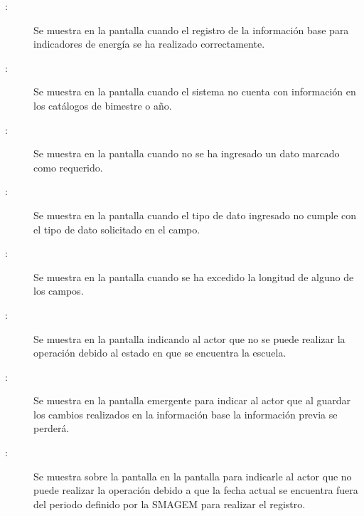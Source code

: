     \begin{description}
      
	    \item [:] Se muestra en la pantalla  cuando el registro de la información base para indicadores de energía se ha realizado correctamente.
	    
	    \item [:] Se muestra en la pantalla  cuando el sistema no cuenta con información en los catálogos de bimestre o año.
	    
	    \item [:] Se muestra en la pantalla  cuando no se ha ingresado un dato marcado como requerido.
	    
	    \item [:] Se muestra en la pantalla  cuando el tipo de dato ingresado no cumple con el tipo de dato solicitado en el campo.
	    
	    \item [:] Se muestra en la pantalla  cuando se ha excedido la longitud de alguno de los campos.	    
	      
	    \item[:] Se muestra en la pantalla  indicando al actor que no se puede realizar la operación debido al estado en que se encuentra la escuela.
	    
	    \item [:] Se muestra en la pantalla emergente  para indicar al actor que al guardar los cambios realizados en la información base la información previa se perderá.  
	    
	    \item [:] Se muestra sobre la pantalla en la pantalla  para indicarle al actor que no puede realizar la operación debido a que la fecha actual se encuentra fuera del periodo definido por la SMAGEM para realizar el registro.
    \end{description}
